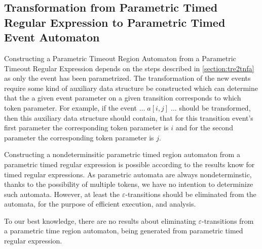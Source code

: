 		\subsection{Transformation from Parametric Timed Regular Expression to Parametric Timed Event Automaton}
		\label{section:ptre2tnfa}	
			
		Constructing a Parametric Timeout Region Automaton from a Parametric Timeout Regular Expression depends on the steps described in \cref{section:tre2tnfa} as only the event has been parametrized. The transformation of the new events require some kind of auxiliary data structure be constructed which can determine that the a given event parameter on a given transition corresponds to which token parameter. For example, if the event $\dots \; a[i,j] \; \dots$ should be transformed, then this auxiliary data structure should contain, that for this transition event's first parameter the corresponding token parameter is $i$ and for the second parameter the corresponding token parameter is $j$. 
		
	
		Constructing a nondeterminsitic parametric timed region automaton from a parametric timed regular expression is possible according to the results know for timed regular expressions. As parametric automata are always nondeterminstic, thanks to the possibility of multiple tokens, we have no intention to determinize such automata.
		However, at least the $\varepsilon$-transitions should be eliminated from the automata, for the purpose of efficient execution, and analysis.
		
		To our best knowledge, there are no results about eliminating $\varepsilon$-transitions from a parametric time region automaton, being generated from parametric timed regular expression.
		